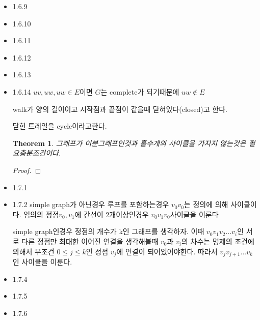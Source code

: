 \documentclass{oblivoir}
\newtheorem{theorem}{Theorem}[section]
\begin{document}
\begin{itemize}
    (a)간선 e가 빠짐으로서 하나였던 component가 두개의 component가 될 요지가 있다. 따라서 $\omega(G) \le \omega(G-e) \le \omega(G)+1 $가 성립한다.

    (b) inequality: 부등식
    반례: $V(G) = { v_1, v_2, v_3} ,\: E(G) = { e_1 , e_2} ,\: \psi_H(e_1) = v_1v_1 ,\psi_H(e_2) = v_2v_3  $
    $v_1$과 $v_2v_3$가 각각 연결되어있는 $\omega(G) = 2$인 그래프이다$v_1$을 제거할때 component가 하나 사라지므로 주어진 부등식을 만족하지 못한다.

    \item 1.6.9
    \item 1.6.10
    \item 1.6.11
    \item 1.6.12
    \item 1.6.13

    \item 1.6.14
    $uv, uw, uw \in E $이면 $G$는 complete가 되기때문에 $uw \notin E$

    \begin{dfn}[cycle]
    walk가 양의 길이이고 시작점과 끝점이 같을때 닫혀있다(closed)고 한다. 

    닫힌 트레일을 cycle이라고한다.
    \end{dfn}

    \begin{theorem}
        그래프가 이분그래프인것과 홀수개의 사이클을 가지지 않는것은 필요충분조건이다.
    \end{theorem}
    \begin{proof}
        
    \end{proof}

    \item 1.7.1
    \item 1.7.2
    simple graph가 아닌경우
          루프를 포함하는경우 $v_0v_0$는 정의에 의해 사이클이다.
               임의의 정점$v_0, v_1$에 간선이 2개이상인경우            $v_0v_1v_0$사이클을 이룬다
         
        simple graph인경우
            정점의 개수가 k인 그래프를 생각하자. 이때 $v_0v_1v_2 ... v_i$인 서로 다른 정점만 최대한 이어진 연결을 생각해볼때 $v_0$과 $v_i$의 차수는 명제의 조건에의해서 무조건 $0 \le j \le k$인 정점 $v_j$에 연결이 되어있어야한다. 따라서 $v_{j}v_{j+1} ... v_k$인 사이클을 이룬다.
    
    \item 1.7.4
    \item 1.7.5
    \item 1.7.6
    

\end{itemize}
\end{document}
